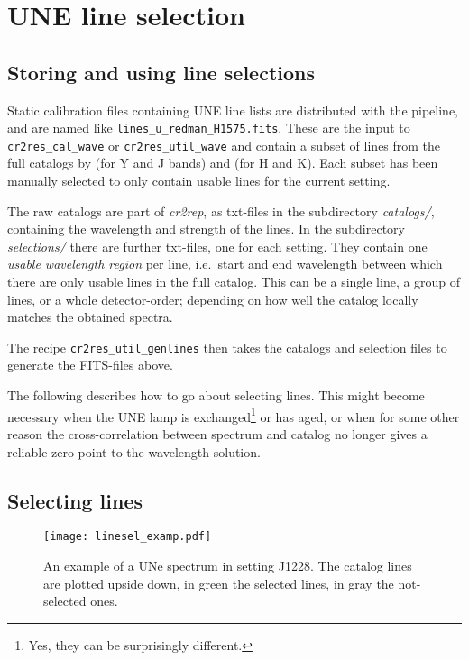 \section{UNE line selection}
\label{sec:uneselect}

\subsection*{Storing and using line selections}

Static calibration files containing UNE line lists are distributed with the
pipeline, and are named like \linebreak \verb#lines_u_redman_H1575.fits#. These
are the input to \verb#cr2res_cal_wave# or \verb#cr2res_util_wave# and contain a
subset of lines from the full catalogs by \cite{2018A&A...618A.118S} (for Y and
J bands) and \cite{2011ApJS..195...24R} (for H and K). Each subset has been
manually selected to only contain usable lines for the current setting.

The raw catalogs are part of \emph{cr2rep}, as txt-files in the subdirectory
\emph{catalogs/}, containing the wavelength and strength of the lines. In the
subdirectory \emph{selections/} there are further txt-files, one for each
setting. They contain one \emph{usable wavelength region} per line, i.e.~start
and end wavelength between which there are only usable lines in the full
catalog. This can be a single line, a group of lines, or a whole detector-order; depending on how well the catalog locally matches the obtained spectra.

The recipe \verb#cr2res_util_genlines# then takes the catalogs and selection files to generate the FITS-files above.

The following describes how to go about selecting lines. This might become necessary when the UNE lamp is exchanged\footnote{Yes, they can be surprisingly different.} or has aged, or when for some other reason the cross-correlation  between spectrum and catalog no longer gives a reliable zero-point to the wavelength solution.

\subsection*{Selecting lines}

\begin{figure}[ht]
    \begin{center}
\texttt{[image: linesel\_examp.pdf]}
\end{center}
\caption{An example of a UNe spectrum in setting J1228. The catalog lines are
 plotted upside down, in green the selected lines, in gray the not-selected
 ones. }
\label{fig:linesel}
\end{figure}


